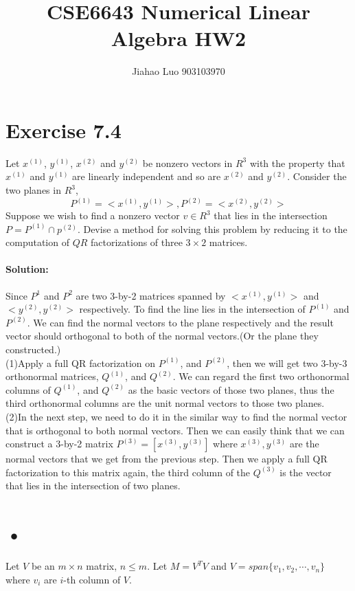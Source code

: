 \documentclass[11pt]{article}
\title{CSE6643 Numerical Linear Algebra HW2}
\author{Jiahao Luo 903103970}
\begin{document}
    
\maketitle  
\section{Exercise 7.4}Let $x^{(1)}$, $y^{(1)}$, $x^{(2)}$ and $y^{(2)}$ be nonzero vectors in $R^3$ with the property that $x^{(1)}$ and $y^{(1)}$ are linearly independent and so are $x^{(2)}$ and $y^{(2)}$. Consider the two planes in $R^3$,
$$P^{(1)}=<x^{(1)},y^{(1)}>, P^{(2)}=<x^{(2)},y^{(2)}>$$
Suppose we wish to find a nonzero vector $v \in R^3$ that lies in the intersection $P=P^{(1)} \cap p^{(2)}$. Devise a method for solving this problem by reducing it to the computation of $QR$ factorizations of three $3 \times 2$ matrices.

\paragraph{Solution:}Since $P^{1}$ and $P^{2}$ are two 3-by-2 matrices spanned by $<x^{(1)}, y^{(1)}>$ and $<y^{(2)}, y^{(2)}>$ respectively. To find the line lies in the intersection of $P^{(1)}$ and $P^{(2)}$. We can find the normal vectors to the plane respectively and the result vector should orthogonal to  both of the normal vectors.(Or the plane they constructed.)\\

(1)Apply a full QR factorization on $P^{(1)}$, and $P^{(2)}$, then we will get two 3-by-3 orthonormal matrices, $Q^{(1)}$, and $Q^{(2)}$. We can regard the first two orthonormal columns of $Q^{(1)}$, and $Q^{(2)}$ as the basic vectors of those two planes, thus the third orthonormal columns are the unit normal vectors to those two planes.\\

(2)In the next step, we need to do it in the similar way to find the normal vector that is orthogonal to both normal vectors. Then we can easily think that we can construct a 3-by-2 matrix $P^{(3)}=[x^{(3)}, y^{(3)}]$ where $x^{(3)}, y^{(3)}$ are the normal vectors that we get from the previous step. Then we apply a full QR factorization to this matrix again, the third column of the $Q^{(3)}$ is the vector that lies in the intersection of two planes.\\

\section{•} Let $V$ be an $m \times n$ matrix, $n \leq m$. Let $M=V^TV$ and $V=span\{v_1,v_2,\cdots,v_n\}$ where $v_i$ are $i$-th column of $V$.\\
\end{document}
